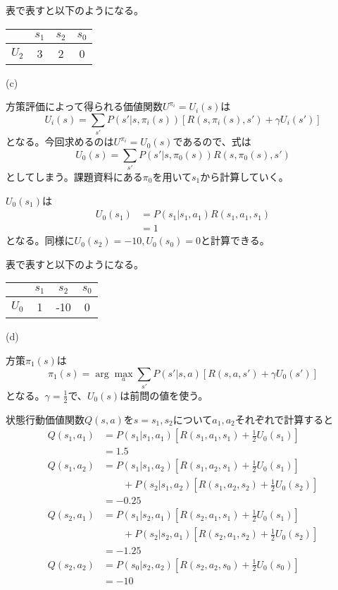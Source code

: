 \documentclass[a4paper,11pt,dvipdfmx]{jsarticle}
\begin{document}
表で表すと以下のようになる。
\begin{center}
    \begin{tabular}[h]{|c|c|c|c|} \hline
              & $s_1$ & $s_2$ & $s_0$ \\ \hline
        $U_2$ &   3   &   2   &   0   \\ \hline
    \end{tabular}
\end{center}

(c)

方策評価によって得られる価値関数$U^{\pi_i}=U_i(s)$は
\[U_i(s)=\sum_{s'}P(s'|s,\pi_i(s))[R(s,\pi_i(s),s')+\gamma U_i(s')]\]
となる。今回求めるのは$U^{\pi_i}=U_0(s)$であるので、式は
\[U_0(s)=\sum_{s'}P(s'|s,\pi_0(s))R(s,\pi_0(s),s')\]
としてしまう。課題資料にある$\pi_0$を用いて$s_1$から計算していく。

$U_0(s_1)$は
\begin{align*}
U_0(s_1) & =P(s_1|s_1,a_1)R(s_1,a_1,s_1)\\
         & =1
\end{align*}
となる。同様に$U_0(s_2)=-10,U_0(s_0)=0$と計算できる。

表で表すと以下のようになる。
\begin{center}
    \begin{tabular}[h]{|c|c|c|c|} \hline
              & $s_1$ & $s_2$ & $s_0$ \\ \hline
        $U_0$ &   1   &  -10  &   0   \\ \hline
    \end{tabular}
\end{center}

(d)

方策$\pi_1(s)$は
\[\pi_1(s)=\arg \max_{a}\sum_{s'}P(s'|s,a)[R(s,a,s')+\gamma U_0(s')]\]
となる。$\gamma = \frac{1}{2}$で、$U_0(s)$は前問の値を使う。

状態行動価値関数$Q(s,a)$を$s=s_1,s_2$について$a_1,a_2$それぞれで計算すると
\begin{align*}
    Q(s_1,a_1) & =P(s_1|s_1,a_1)[R(s_1,a_1,s_1)+\frac{1}{2}U_0(s_1)] \\
               & =1.5\\
    Q(s_1,a_2) & =P(s_1|s_1,a_2)[R(s_1,a_2,s_1)+\frac{1}{2}U_0(s_1)] \\ 
               & \qquad + P(s_2|s_1,a_2)[R(s_1,a_2,s_2)+\frac{1}{2}U_0(s_2)]\\
               & =-0.25\\
    Q(s_2,a_1) & =P(s_1|s_2,a_1)[R(s_2,a_1,s_1)+\frac{1}{2}U_0(s_1)] \\
               & \qquad + P(s_2|s_2,a_1)[R(s_2,a_1,s_2)+\frac{1}{2}U_0(s_2)]\\
               & =-1.25\\
    Q(s_2,a_2) & =P(s_0|s_2,a_2)[R(s_2,a_2,s_0)+\frac{1}{2}U_0(s_0)] \\
               & =-10
\end{align*}
\end{document}
